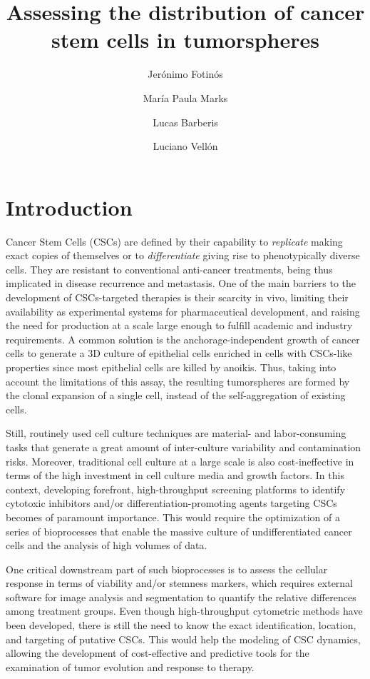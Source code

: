 \documentclass[fleqn,10pt]{wlscirep}
\title{Assessing the distribution of cancer stem cells in tumorspheres}
\author[1]{Jer\'onimo Fotin\'os}
\author[2]{Mar\'ia Paula Marks}
\author[1,*,+]{Lucas Barberis}
\author[2,*,+]{Luciano Vell\'on}
\affil[1]{IFEG-CONICET and FAMAF, Universidad Nacional de C\'{o}rdoba, C\'{o}rdoba, Argentina}
\affil[2]{Stem Cells Lab, IBYME-CONICET, Buenos  Aires, Argentina}
\affil[*]{lbarberis@unc.edu.ar, lvellon73@gmail.com}
\affil[+]{these authors contributed equally to this work}
\begin{document}
\flushbottom
\maketitle

\thispagestyle{empty}


\section*{Introduction} \label{s: intro}

Cancer Stem Cells (CSCs) are defined by their capability to \emph{replicate} making exact copies of themselves or to \emph{differentiate} giving rise to phenotypically diverse cells. They are resistant to conventional anti-cancer treatments, being thus implicated in disease recurrence and metastasis\cite{Al-Hajj, Kakarala}. One of the main barriers to the development of CSCs-targeted therapies is their scarcity in vivo, limiting their availability as experimental systems for pharmaceutical development, and raising the need for production at a scale large enough to fulfill academic and industry requirements. A common solution is the anchorage-independent growth of cancer cells to generate a 3D culture of epithelial cells\cite{Dontu} enriched in cells with CSCs-like properties since most epithelial cells are killed by anoikis\cite{Ehmsen}. Thus, taking into account the limitations of this assay\cite{Pastrana}, the resulting tumorspheres are formed by the clonal expansion of a single cell, instead of the self-aggregation of existing cells.

Still, routinely used cell culture techniques are material- and labor-consuming tasks that generate a great amount of inter-culture variability and contamination risks. Moreover, traditional cell culture at a large scale is also cost-ineffective in terms of the high investment in cell culture media and growth factors. 
In this context, developing forefront, high-throughput screening platforms to identify cytotoxic inhibitors and/or differentiation-promoting agents targeting CSCs becomes of paramount importance. This would require the optimization of a series of bioprocesses that enable the massive culture of undifferentiated cancer cells and the analysis of high volumes of data. 

One critical downstream part of such bioprocesses is to assess the cellular response in terms of viability and/or stemness markers, which requires external software for image analysis and segmentation to quantify the relative differences among treatment groups. Even though high-throughput cytometric methods have been developed\cite{Kessel}, there is still the need to know the exact identification, location, and targeting of putative CSCs. This would help the modeling of CSC dynamics, allowing the development of cost-effective and predictive tools for the examination of tumor evolution and response to therapy.
%
\end{document}
